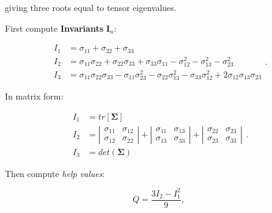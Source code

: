 \documentclass[10pt,b5paper,titlepage]{book}
\begin{document}
\begin{itemize}
        giving three roots equal to tensor eigenvalues.

        First compute \textbf{Invariants} $\mathbf{I}_{n}$:

        \begin{equation}
            \begin{array}{ll}
                I_{1} &= \sigma_{11} + \sigma_{22} + \sigma_{33} \\
                I_{2} &= \sigma_{11}\sigma_{22} + \sigma_{22}\sigma_{33}
                + \sigma_{33}\sigma_{11} - \sigma_{12}^{2} - \sigma_{13}^{2} - \sigma_{23}^{2} \\
                I_{3}
                &= \sigma_{11}\sigma_{22}\sigma_{33}
                - \sigma_{11}\sigma_{23}^{2}
                - \sigma_{22}\sigma_{13}^{2}
                - \sigma_{33}\sigma_{12}^{2}
                + 2 \sigma_{12}\sigma_{13}\sigma_{23}
            \end{array}
        .\end{equation}

        In matrix form:

        \begin{equation}
            \begin{array}{ll}
                I_{1} &= tr[\mathbf{\Sigma}] \\
                I_{2} &= \left| \begin{matrix}
                    \sigma_{11} & \sigma_{12} \\
                    \sigma_{12} & \sigma_{22}
                \end{matrix} \right| + \left| \begin{matrix}
                    \sigma_{11} & \sigma_{13} \\
                    \sigma_{13} & \sigma_{33}
                \end{matrix} \right| + \left| \begin{matrix}
                    \sigma_{22} & \sigma_{23} \\
                    \sigma_{23} & \sigma_{33}
                \end{matrix} \right| \\
                    I_{3} &= det(\mathbf{\Sigma})
            \end{array}
        .\end{equation}

        Then compute \textit{help values}:

        \begin{equation}
            Q = \frac{3 I_{2} - I_{1}^{2}}{9}
        ,\end{equation}


\end{itemize}
\end{document}
